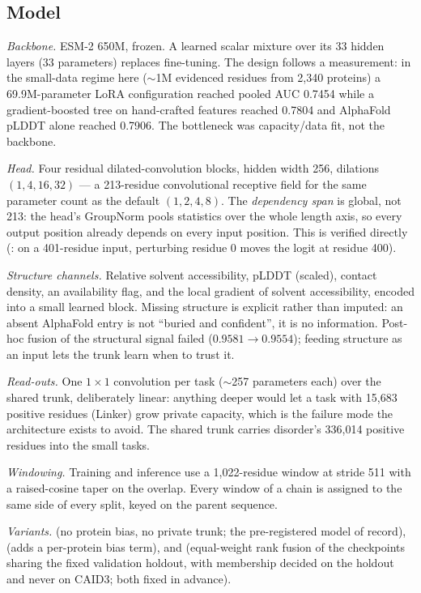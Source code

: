 \subsection*{Model}

\emph{Backbone.} ESM-2 650M\cite{esm2}, frozen. A learned scalar mixture over
its 33 hidden layers (33 parameters) replaces fine-tuning. The design follows a
measurement: in the small-data regime here ($\sim$1M evidenced residues from
2{,}340 proteins) a 69.9M-parameter LoRA configuration reached pooled AUC 0.7454
while a gradient-boosted tree on hand-crafted features reached 0.7804 and
AlphaFold pLDDT alone reached 0.7906. The bottleneck was capacity/data fit, not
the backbone.

\emph{Head.} Four residual dilated-convolution blocks, hidden width 256,
dilations $(1,4,16,32)$ --- a 213-residue convolutional receptive field for the
same parameter count as the default $(1,2,4,8)$. The \emph{dependency span} is
global, not 213: the head's GroupNorm pools statistics over the whole length
axis, so every output position already depends on every input position. This is
verified directly (: on a
401-residue input, perturbing residue 0 moves the logit at residue 400).

\emph{Structure channels.} Relative solvent accessibility, pLDDT (scaled),
contact density, an availability flag, and the local gradient of solvent
accessibility, encoded into a small learned block. Missing structure is explicit
rather than imputed: an absent AlphaFold entry is not ``buried and confident'',
it is no information. Post-hoc fusion of the structural signal failed
($0.9581 \rightarrow 0.9554$); feeding structure as an input lets the trunk
learn when to trust it.

\emph{Read-outs.} One $1\times1$ convolution per task ($\sim$257 parameters
each) over the shared trunk, deliberately linear: anything deeper would let a
task with 15{,}683 positive residues (Linker) grow private capacity, which is
the failure mode the architecture exists to avoid. The shared trunk carries
disorder's 336{,}014 positive residues into the small tasks.

\emph{Windowing.} Training and inference use a 1{,}022-residue window at stride
511 with a raised-cosine taper on the overlap. Every window of a chain is
assigned to the same side of every split, keyed on the parent sequence.

\emph{Variants.}  (no protein bias, no private trunk; the
pre-registered model of record),  (adds a per-protein bias
term), and  (equal-weight rank fusion of the
checkpoints sharing the fixed validation holdout, with membership decided on the
holdout and never on CAID3; both fixed in advance).

